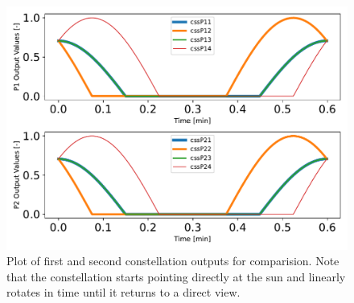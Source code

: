 \begin{figure}[htbp]\centerline{\includegraphics[height=0.7\textwidth, keepaspectratio]{AutoTeX/constellationPlots}}\caption{Plot of first and second constellation outputs for comparision.                                          Note that the constellation starts pointing directly at the sun                                           and linearly rotates in time until it returns to a direct view.}\label{fig:constellationPlots}\end{figure}